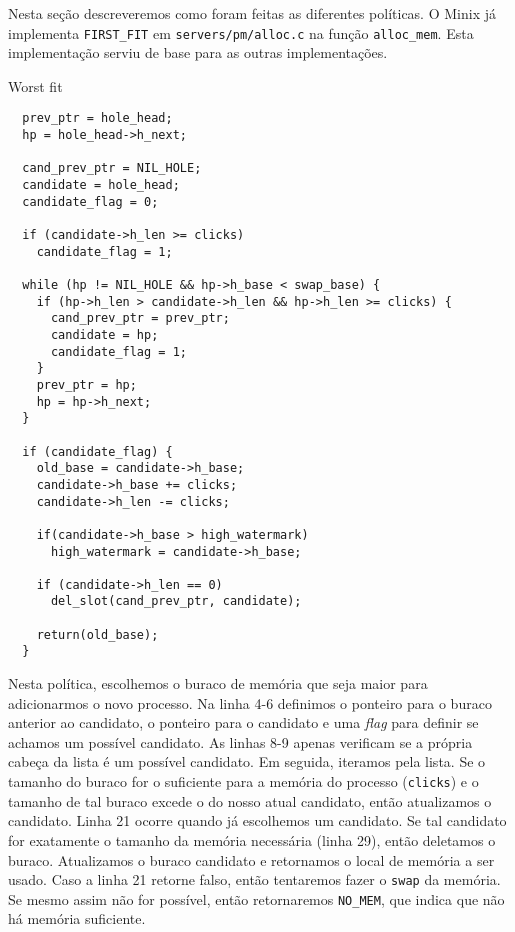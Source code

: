 \documentclass{amsart}
\makeatletter
\def\subsection{\@startsection{subsection}{3}%
  \z@{.5\linespacing\@plus.7\linespacing}{.1\linespacing}%
  {\normalfont}}
\theoremstyle{plain}
\newcommand{\code}[1]{\lstinline[mathescape=true]{#1}}
\makeatother
\begin{document}
Nesta seção descreveremos como foram feitas as diferentes políticas. O Minix já implementa
\code{FIRST_FIT} em \code{servers/pm/alloc.c} na função \code{alloc_mem}. Esta implementação serviu
de base para as outras implementações.

\subsection{Worst fit}

\begin{verbatim}
  prev_ptr = hole_head;
  hp = hole_head->h_next;

  cand_prev_ptr = NIL_HOLE;
  candidate = hole_head;
  candidate_flag = 0;

  if (candidate->h_len >= clicks)
    candidate_flag = 1;

  while (hp != NIL_HOLE && hp->h_base < swap_base) {
    if (hp->h_len > candidate->h_len && hp->h_len >= clicks) {
      cand_prev_ptr = prev_ptr;
      candidate = hp;
      candidate_flag = 1;
    }
    prev_ptr = hp;
    hp = hp->h_next;
  }

  if (candidate_flag) {
    old_base = candidate->h_base;
    candidate->h_base += clicks;
    candidate->h_len -= clicks;

    if(candidate->h_base > high_watermark)
      high_watermark = candidate->h_base;

    if (candidate->h_len == 0)
      del_slot(cand_prev_ptr, candidate);

    return(old_base);
  }
\end{verbatim}

Nesta política, escolhemos o buraco de memória que seja maior para adicionarmos o novo processo. Na
linha 4-6 definimos o ponteiro para o buraco anterior ao candidato, o ponteiro para o candidato e
uma \textit{flag} para definir se achamos um possível candidato. As linhas 8-9 apenas verificam se
a própria cabeça da lista é um possível candidato. Em seguida, iteramos pela lista. Se o tamanho do
buraco for o suficiente para a memória do processo (\code{clicks}) e o tamanho de tal buraco excede
o do nosso atual candidato, então atualizamos o candidato. Linha 21 ocorre quando já escolhemos um
candidato. Se tal candidato for exatamente o tamanho da memória necessária (linha 29), então
deletamos o buraco. Atualizamos o buraco candidato e retornamos o local de memória a ser usado.
Caso a linha 21 retorne falso, então tentaremos fazer o \code{swap} da memória. Se mesmo assim não
for possível, então retornaremos \code{NO_MEM}, que indica que não há memória suficiente.
\end{document}
